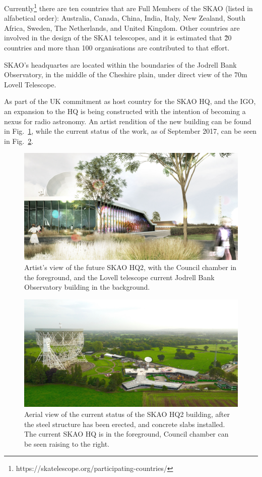 \documentclass[a4paper,
               biblatex,       %
               keeplastbox,    %
               ]{jacow-2_1}    %
\begin{document}
Currently\footnote{https://skatelescope.org/participating-countries/} there are ten countries that are Full Members of the SKAO (listed in alfabetical order): Australia, Canada, China, India, Italy, New Zealand, South Africa, Sweden, The Netherlands, and United Kingdom. Other countries are involved in the design of the SKA1 telescopes, and it is estimated that \~20 countries and more than 100 organisations are contributed to that effort.

SKAO's headquartes are located within the boundaries of the Jodrell Bank Observatory, in the middle of the Cheshire plain, under direct view of the 70m Lovell Telescope.

As part of the UK commitment as host country for the SKAO HQ, and the IGO, an expansion to the HQ is being constructed with the intention of becoming a nexus for radio astronomy. An artist rendition of the new building can be found in Fig.~\ref{fig:SKA-HQ-render}, while the current status of the work, as of September 2017, can be seen in Fig.~\ref{fig:SKA-HQ2-aerial}.

\begin{figure}[!htb]
  \centering
    \includegraphics[width=\columnwidth]{figs/SKA-HQ-render}
  \caption{Artist's view of the future SKAO HQ2, with the Council chamber in the foreground, and the Lovell telescope current Jodrell Bank Observatory building in the background.}
  \label{fig:SKA-HQ-render}
\end{figure}

\begin{figure}[!htb]
  \centering
    \includegraphics[width=\columnwidth]{figs/SKA-HQ2-aerial}
  \caption{Aerial view of the current status of the SKAO HQ2 building, after the steel structure has been erected, and concrete slabs installed. The current SKAO HQ is in the foreground, Council chamber can be seen raising to the right.}
  \label{fig:SKA-HQ2-aerial}
\end{figure}
\end{document}
